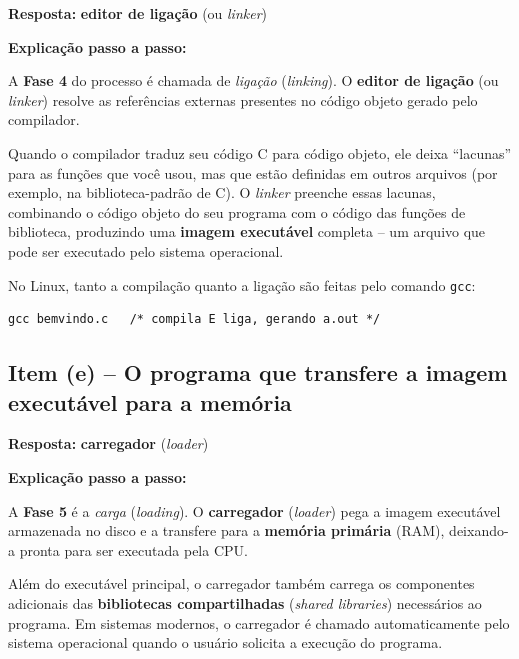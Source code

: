 \documentclass[12pt,a4paper]{article}
\begin{document}
\begin{respostabox}
\textbf{Resposta:} \textcolor{deitelblue}{\textbf{editor de ligação} (ou \textit{linker})}

\medskip
\textbf{Explicação passo a passo:}

A \textbf{Fase 4} do processo é chamada de \textit{ligação} (\textit{linking}). O
\textbf{editor de ligação} (ou \textit{linker}) resolve as referências externas presentes
no código objeto gerado pelo compilador.

Quando o compilador traduz seu código C para código objeto, ele deixa ``lacunas'' para
as funções que você usou, mas que estão definidas em outros arquivos (por exemplo, na
biblioteca-padrão de C). O \textit{linker} preenche essas lacunas, combinando o código
objeto do seu programa com o código das funções de biblioteca, produzindo uma
\textbf{imagem executável} completa -- um arquivo que pode ser executado pelo sistema
operacional.

No Linux, tanto a compilação quanto a ligação são feitas pelo comando \texttt{gcc}:
\begin{lstlisting}
gcc bemvindo.c   /* compila E liga, gerando a.out */
\end{lstlisting}
\end{respostabox}

\bigskip

\subsection*{Item (e) -- O programa que transfere a imagem executável para a memória}

\begin{respostabox}
\textbf{Resposta:} \textcolor{deitelblue}{\textbf{carregador} (\textit{loader})}

\medskip
\textbf{Explicação passo a passo:}

A \textbf{Fase 5} é a \textit{carga} (\textit{loading}). O \textbf{carregador}
(\textit{loader}) pega a imagem executável armazenada no disco e a transfere para a
\textbf{memória primária} (RAM), deixando-a pronta para ser executada pela CPU.

Além do executável principal, o carregador também carrega os componentes adicionais das
\textbf{bibliotecas compartilhadas} (\textit{shared libraries}) necessários ao programa.
Em sistemas modernos, o carregador é chamado automaticamente pelo sistema operacional
quando o usuário solicita a execução do programa.
\end{respostabox}
\end{document}
